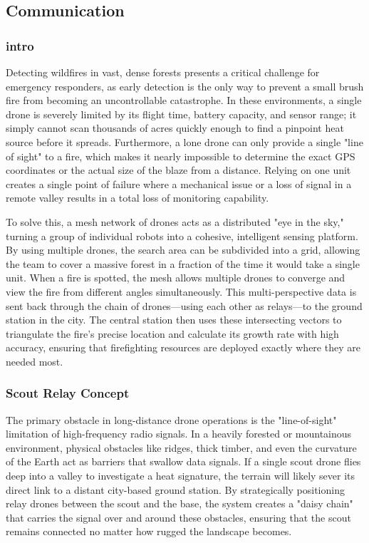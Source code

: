 \documentclass[journal, onecolumn]{IEEEtran}
\begin{document}
\vspace{1em}

\subsection{Communication}
\subsubsection{intro}
Detecting wildfires in vast, dense forests presents a critical challenge for emergency responders, as early detection is the only way to prevent a small brush fire from becoming an uncontrollable catastrophe. In these environments, a single drone is severely limited by its flight time, battery capacity, and sensor range; it simply cannot scan thousands of acres quickly enough to find a pinpoint heat source before it spreads. Furthermore, a lone drone can only provide a single "line of sight" to a fire, which makes it nearly impossible to determine the exact GPS coordinates or the actual size of the blaze from a distance. Relying on one unit creates a single point of failure where a mechanical issue or a loss of signal in a remote valley results in a total loss of monitoring capability.

To solve this, a mesh network of drones acts as a distributed "eye in the sky," turning a group of individual robots into a cohesive, intelligent sensing platform. By using multiple drones, the search area can be subdivided into a grid, allowing the team to cover a massive forest in a fraction of the time it would take a single unit. When a fire is spotted, the mesh allows multiple drones to converge and view the fire from different angles simultaneously. This multi-perspective data is sent back through the chain of drones—using each other as relays—to the ground station in the city. The central station then uses these intersecting vectors to triangulate the fire's precise location and calculate its growth rate with high accuracy, ensuring that firefighting resources are deployed exactly where they are needed most.

\subsubsection{Scout Relay Concept}

The primary obstacle in long-distance drone operations is the "line-of-sight" limitation of high-frequency radio signals. In a heavily forested or mountainous environment, physical obstacles like ridges, thick timber, and even the curvature of the Earth act as barriers that swallow data signals. If a single scout drone flies deep into a valley to investigate a heat signature, the terrain will likely sever its direct link to a distant city-based ground station. By strategically positioning relay drones between the scout and the base, the system creates a "daisy chain" that carries the signal over and around these obstacles, ensuring that the scout remains connected no matter how rugged the landscape becomes.
\end{document}
